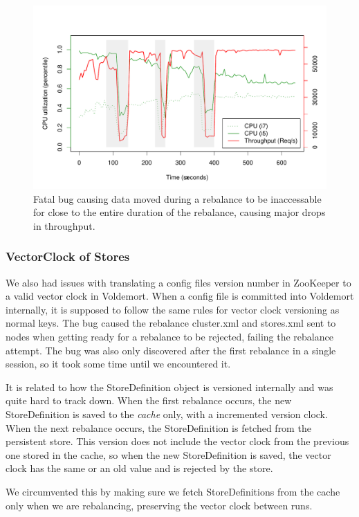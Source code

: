 \begin{figure}[h]
    \centering
    \includegraphics[width=1.0\textwidth]{results/throughput/adaptive/zookeeper/auto_2nodes_error}
    \caption{Fatal bug causing data moved during a rebalance to be inaccessable for close to the entire duration of the rebalance, causing major drops in throughput.}
    \label{fig:adaptive_bug}
\end{figure}

\subsubsection{VectorClock of Stores}
We also had issues with translating a config files version number in ZooKeeper to a valid vector clock in Voldemort. When a config file is committed into Voldemort internally, it is supposed to follow the same rules for vector clock versioning as normal keys.
The bug caused the rebalance cluster.xml and stores.xml sent to nodes when getting ready for a rebalance to be rejected, failing the rebalance attempt.
The bug was also only discovered after the first rebalance in a single session, so it took some time until we encountered it.

It is related to how the StoreDefinition object is versioned internally and was quite hard to track down. When the first rebalance occurs, the new StoreDefinition is saved to the \emph{cache} only, with a incremented version clock. When the next rebalance occurs, the StoreDefinition is fetched from the persistent store. This version does not include the vector clock from the previous one stored in the cache, so when the new StoreDefinition is saved, the vector clock has the same or an old value and is rejected by the store.

We circumvented this by making sure we fetch StoreDefinitions from the cache only when we are rebalancing, preserving the vector clock between runs.


